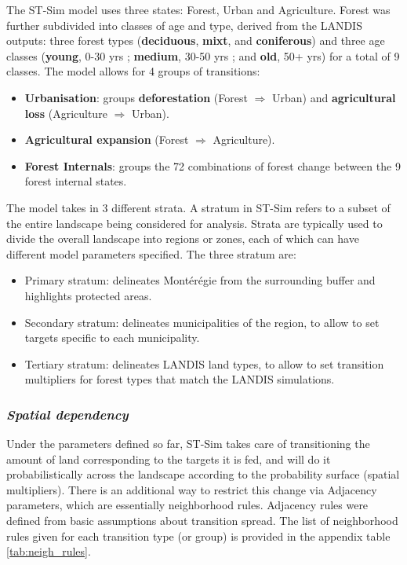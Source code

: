 The ST-Sim model uses three states: Forest, Urban and Agriculture. Forest was further subdivided into classes of age and type, derived from the LANDIS outputs: three forest types (\textbf{deciduous}, \textbf{mixt}, and \textbf{coniferous}) and three age classes (\textbf{young}, 0-30 yrs ; \textbf{medium}, 30-50 yrs ; and \textbf{old}, 50+ yrs) for a total of 9 classes.
The model allows for 4 groups of transitions:
\begin{itemize}
\item{\textbf{Urbanisation}}: groups \textbf{deforestation} (Forest $\Rightarrow$ Urban) and \textbf{agricultural loss} (Agriculture $\Rightarrow$ Urban).
\item{\textbf{Agricultural expansion}} (Forest $\Rightarrow$ Agriculture).
\item{\textbf{Forest Internals}}: groups the 72 combinations of forest change between the 9 forest internal states.
\end{itemize}
The model takes in 3 different strata. A stratum in ST-Sim refers to a subset of the entire landscape being considered for analysis. Strata are typically used to divide the overall landscape into regions or zones, each of which can have different model parameters specified. The three stratum are:
\begin{itemize}
\item{Primary stratum:} delineates Montérégie from the surrounding buffer and highlights protected areas.
\item{Secondary stratum:} delineates municipalities of the region, to allow to set targets specific to each municipality.
\item{Tertiary stratum:} delineates LANDIS land types, to allow to set transition multipliers for forest types that match the LANDIS simulations. \\
\end{itemize}

\subsubsection*{\textit{Spatial dependency}}

Under the parameters defined so far, ST-Sim takes care of transitioning the amount of land corresponding to the targets it is fed, and will do it probabilistically across the landscape according to the probability surface (spatial multipliers). There is an additional way to restrict this change via Adjacency parameters, which are essentially neighborhood rules. Adjacency rules were defined from basic assumptions about transition spread. The list of neighborhood rules given for each transition type (or group) is provided in the appendix table \ref{tab:neigh_rules}.

